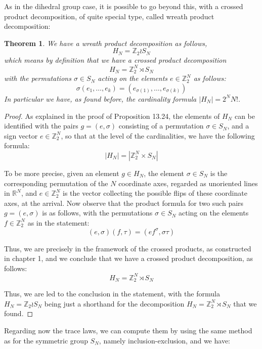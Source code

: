\documentclass[12pt]{amsbook}
\newtheorem{theorem}{Theorem}[chapter]
\begin{document}
As in the dihedral group case, it is possible to go beyond this, with a crossed product decomposition, of quite special type, called wreath product decomposition:


\begin{theorem}
We have a wreath product decomposition as follows,
$$H_N=\mathbb Z_2\wr S_N$$
which means by definition that we have a crossed product decomposition
$$H_N=\mathbb Z_2^N\rtimes S_N$$
with the permutations $\sigma\in S_N$ acting on the elements $e\in\mathbb Z_2^N$ as follows:
$$\sigma(e_1,\ldots,e_k)=(e_{\sigma(1)},\ldots,e_{\sigma(k)})$$
In particular we have, as found before, the cardinality formula $|H_N|=2^NN!$.
\end{theorem}

\begin{proof}
As explained in the proof of Proposition 13.24, the elements of $H_N$ can be identified with the pairs $g=(e,\sigma)$ consisting of a permutation $\sigma\in S_N$, and a sign vector $e\in\mathbb Z_2^N$, so that at the level of the cardinalities, we have the following formula:
$$|H_N|=|\mathbb Z_2^N\times S_N|$$

To be more precise, given an element $g\in H_N$, the element $\sigma\in S_N$ is the corresponding permutation of the $N$ coordinate axes, regarded as unoriented lines in $\mathbb R^N$, and $e\in\mathbb Z_2^N$ is the vector collecting the possible flips of these coordinate axes, at the arrival. Now observe that the product formula for two such pairs $g=(e,\sigma)$ is as follows, with the permutations $\sigma\in S_N$ acting on the elements $f\in\mathbb Z_2^N$ as in the statement:
$$(e,\sigma)(f,\tau)=(ef^\sigma,\sigma\tau)$$

Thus, we are precisely in the framework of the crossed products, as constructed in chapter 1, and we conclude that we have a crossed product decomposition, as follows:
$$H_N=\mathbb Z_2^N\rtimes S_N$$
 
Thus, we are led to the conclusion in the statement, with the formula $H_N=\mathbb Z_2\wr S_N$ being just a shorthand for the decomposition $H_N=\mathbb Z_2^N\rtimes S_N$ that we found.
\end{proof}

Regarding now the trace laws, we can compute them by using the same method as for the symmetric group $S_N$, namely inclusion-exclusion, and we have:

\end{document}
